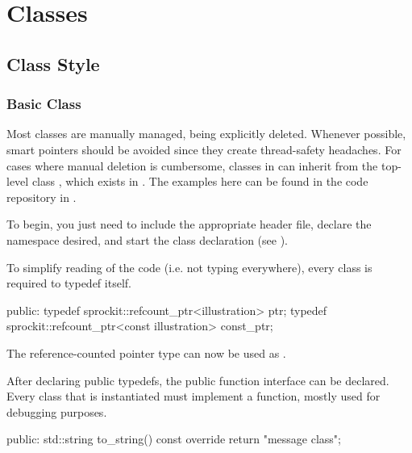 
\chapter{\sstmacro Classes}\label{chapter:classes}

\section{Class Style}\label{sec:style}

\subsection{Basic Class}\label{subsec:basicClass}
Most classes are manually managed, being explicitly deleted.  Whenever possible,
smart pointers should be avoided since they create thread-safety headaches.
For cases where manual deletion is cumbersome, classes in \sstmacro can inherit from the top-level class , 
which exists in . 
The examples here can be found in the code repository in .

To begin, you just need to include the appropriate header file, declare the namespace desired, and start the class declaration (see ).

\begin{CppCode}
#include <sprockit/ptr_type.h>

namespace sstmac {
namespace tutorial {

class illustration :
  public sprockit::ptr_type
{
\end{CppCode}
To simplify reading of the code (i.e. not typing  everywhere), every class is required to typedef itself.

\begin{CppCode}
 public:
  typedef sprockit::refcount_ptr<illustration> ptr;
  typedef sprockit::refcount_ptr<const illustration> const_ptr;
\end{CppCode}
The reference-counted pointer type can now be used as .

After declaring public typedefs, the public function interface can be declared.
Every  class that is instantiated must implement a  function,
mostly used for debugging purposes.

\begin{CppCode}
 public:
  std::string
  to_string() const override {
    return "message class";
   }
\end{CppCode}

